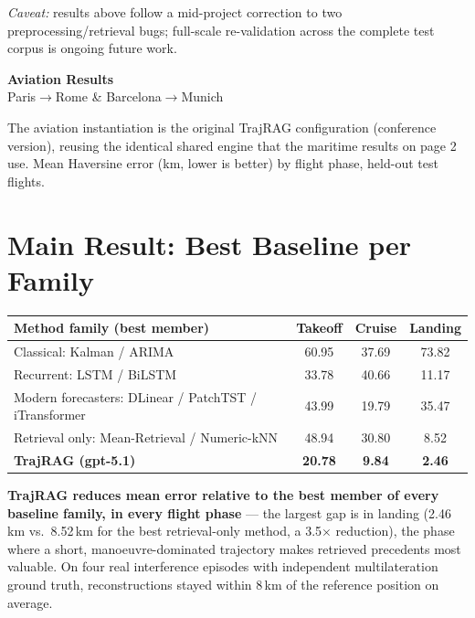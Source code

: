 \documentclass[10pt]{article}
\begin{document}
\emph{Caveat:} results above follow a mid-project correction to two
preprocessing/retrieval bugs; full-scale re-validation across the complete
test corpus is ongoing future work.

\newpage
\begin{center}
{\LARGE\bfseries Aviation Results}\\[2pt]
{\large Paris$\to$Rome \& Barcelona$\to$Munich}
\end{center}
\vspace{2pt}

The aviation instantiation is the original TrajRAG configuration (conference
version), reusing the identical shared engine that the maritime results on
page 2 use. Mean Haversine error (km, lower is better) by flight phase,
held-out test flights.

\section*{Main Result: Best Baseline per Family}

\begin{center}
\begin{tabular}{lccc}
\toprule
\textbf{Method family (best member)} & \textbf{Takeoff} & \textbf{Cruise} & \textbf{Landing} \\
\midrule
Classical: Kalman / ARIMA & 60.95 & 37.69 & 73.82 \\
Recurrent: LSTM / BiLSTM & 33.78 & 40.66 & 11.17 \\
Modern forecasters: DLinear / PatchTST / iTransformer & 43.99 & 19.79 & 35.47 \\
Retrieval only: Mean-Retrieval / Numeric-kNN & 48.94 & 30.80 & 8.52 \\
\textbf{TrajRAG (gpt-5.1)} & \textbf{20.78} & \textbf{9.84} & \textbf{2.46} \\
\bottomrule
\end{tabular}
\end{center}
\vspace{2pt}

\textbf{TrajRAG reduces mean error relative to the best member of every
baseline family, in every flight phase} --- the largest gap is in landing
(2.46\,km vs.\ 8.52\,km for the best retrieval-only method, a 3.5$\times$
reduction), the phase where a short, manoeuvre-dominated trajectory makes
retrieved precedents most valuable. On four real interference episodes with
independent multilateration ground truth, reconstructions stayed within
8\,km of the reference position on average.
\end{document}
